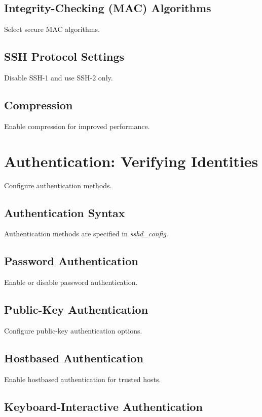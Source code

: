 \documentclass[12pt]{book}
\begin{document}
\subsection{Integrity-Checking (MAC) Algorithms}

Select secure MAC algorithms.

\subsection{SSH Protocol Settings}

Disable SSH-1 and use SSH-2 only.

\subsection{Compression}

Enable compression for improved performance.

\section{Authentication: Verifying Identities}

Configure authentication methods.

\subsection{Authentication Syntax}

Authentication methods are specified in \textit{sshd\_config}.

\subsection{Password Authentication}

Enable or disable password authentication.

\subsection{Public-Key Authentication}

Configure public-key authentication options.

\subsection{Hostbased Authentication}

Enable hostbased authentication for trusted hosts.

\subsection{Keyboard-Interactive Authentication}
\end{document}
